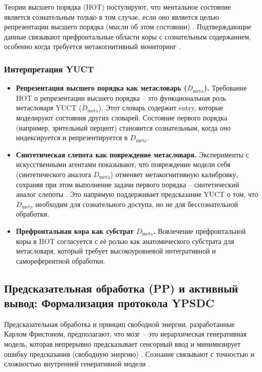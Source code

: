 \documentclass[12pt,a4paper]{article}
\begin{document}
	Теории высшего порядка (HOT) постулируют, что ментальное состояние является сознательным только в том случае, если оно является целью репрезентации высшего порядка (мысли об этом состоянии) \cite{Rosenthal2005}. Подтверждающие данные связывают префронтальные области коры с сознательным содержанием, особенно когда требуется метакогнитивный мониторинг \cite{Seth2022}.
	
	\subsubsection*{Интерпретация YUCT}
	\begin{itemize}
		\item \textbf{Репрезентация высшего порядка как метасловарь (\(D_{\text{meta}}\)).} Требование HOT о репрезентации высшего порядка – это функциональная роль метасловаря YUCT (\(D_{\text{meta}}\)). Этот словарь содержит entry, которые моделируют состояния других словарей. Состояние первого порядка (например, зрительный перцепт) становится сознательным, когда оно индексируется и репрезентируется в \(D_{\text{meta}}\).
		\item \textbf{Синтетическая слепота как повреждение метасловаря.} Эксперименты с искусственными агентами показывают, что повреждение модели себя (синтетического аналога \(D_{\text{meta}}\)) отменяет метакогнитивную калибровку, сохраняя при этом выполнение задачи первого порядка – синтетический аналог слепоты \cite{Phua2026}. Это напрямую поддерживает предсказание YUCT о том, что \(D_{\text{meta}}\) необходим для сознательного доступа, но не для бессознательной обработки.
		\item \textbf{Префронтальная кора как субстрат \(D_{\text{meta}}\).} Вовлечение префронтальной коры в HOT согласуется с её ролью как анатомического субстрата для метасловаря, который требует высокоуровневой интегративной и самореферентной обработки.
	\end{itemize}
	
	\subsection{Предсказательная обработка (PP) и активный вывод: Формализация протокола YPSDC}
	
	Предсказательная обработка и принцип свободной энергии, разработанные Карлом Фристоном, предполагают, что мозг – это иерархическая генеративная модель, которая непрерывно предсказывает сенсорный ввод и минимизирует ошибку предсказания (свободную энергию) \cite{Friston2010, Clark2016}. Сознание связывают с точностью и сложностью внутренней генеративной модели \cite{Hohwy2013}.
	
\end{document}
